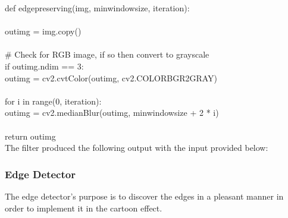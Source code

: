 \documentclass{article}
\begin{document}
	\noindent def edge\textunderscore preserving(img, min\textunderscore window\textunderscore size, iteration):\\
	\\
	\indent out\textunderscore img = img.copy()\\
	\\
	\indent \#     Check for RGB image, if so then convert to grayscale\\
	\indent if out\textunderscore img.ndim == 3:   \\      
	\indent \indent out\textunderscore img = cv2.cvtColor(out\textunderscore img, cv2.COLOR\textunderscore BGR2GRAY)\\
	\\
	\indent for i in range(0, iteration):\\
	\indent \indent out\textunderscore img = cv2.medianBlur(out\textunderscore img, min\textunderscore window\textunderscore size + 2 * i)\\
	\\
	\indent return out\textunderscore img\\
	
	The filter produced the following output with the input provided below:\\
	
	\subsubsection{Edge Detector}
	
	The edge detector's purpose is to discover the edges in a pleasant manner in order to implement it in the cartoon effect. \\
	
\end{document}

